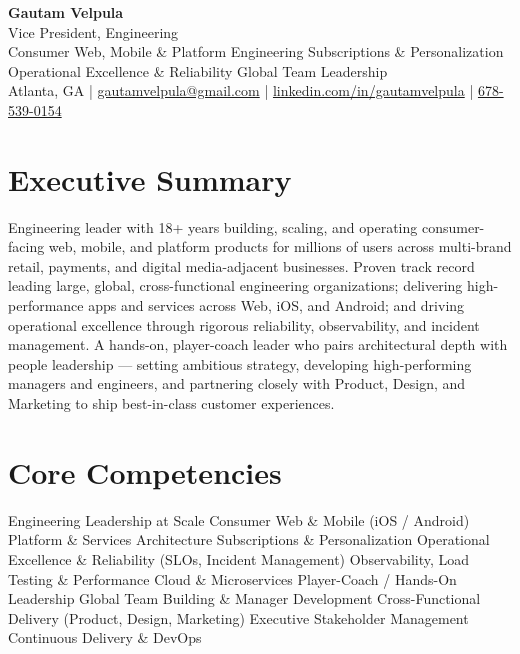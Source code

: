 \documentclass[11pt]{article}
\begin{document}
\begin{center}
    {\LARGE \textbf{Gautam Velpula}} \\[4pt]
    Vice President, Engineering \\[6pt]
    Consumer Web, Mobile \& Platform Engineering \textbullet{} Subscriptions \& Personalization \textbullet{} Operational Excellence \& Reliability \textbullet{} Global Team Leadership \\[6pt]
    Atlanta, GA \;|\;
    \href{mailto:gautamvelpula@gmail.com}{gautamvelpula@gmail.com} \;|\;
    \href{https://www.linkedin.com/in/gautamvelpula}{linkedin.com/in/gautamvelpula} \;|\;
    \href{tel:6785390154}{678-539-0154}
\end{center}

\vspace{8pt}

\section*{Executive Summary}
Engineering leader with 18+ years building, scaling, and operating consumer-facing web, mobile, and platform products for millions of users across multi-brand retail, payments, and digital media-adjacent businesses. Proven track record leading large, global, cross-functional engineering organizations; delivering high-performance apps and services across Web, iOS, and Android; and driving operational excellence through rigorous reliability, observability, and incident management. A hands-on, player-coach leader who pairs architectural depth with people leadership --- setting ambitious strategy, developing high-performing managers and engineers, and partnering closely with Product, Design, and Marketing to ship best-in-class customer experiences.

\section*{Core Competencies}
Engineering Leadership at Scale \textbullet{} Consumer Web \& Mobile (iOS / Android) \textbullet{} Platform \& Services Architecture \textbullet{} Subscriptions \& Personalization \textbullet{} Operational Excellence \& Reliability (SLOs, Incident Management) \textbullet{} Observability, Load Testing \& Performance \textbullet{} Cloud \& Microservices \textbullet{} Player-Coach / Hands-On Leadership \textbullet{} Global Team Building \& Manager Development \textbullet{} Cross-Functional Delivery (Product, Design, Marketing) \textbullet{} Executive Stakeholder Management \textbullet{} Continuous Delivery \& DevOps
\end{document}
